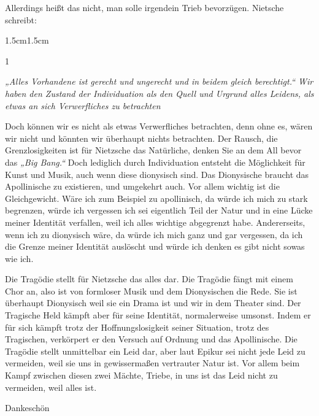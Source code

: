 \documentclass[12pt,a4paper]{article}
\begin{document}
Allerdings heißt das nicht, man solle irgendein Trieb bevorzügen. Nietsche schreibt:
\begin{adjustwidth}{1.5cm}{1.5cm}
    \begin{spacing}{1}
        \begin{center}
            \small
                \textit{„Alles Vorhandene ist gerecht und ungerecht und in beidem gleich berechtigt.“ Wir haben den Zustand der Individuation als den Quell und Urgrund alles Leidens, als etwas an sich Verwerfliches zu betrachten}
        \end{center}
    \end{spacing}
\end{adjustwidth}
Doch können wir es nicht als etwas Verwerfliches betrachten, denn ohne es, wären wir nicht und könnten wir überhaupt nichts betrachten. Der Rausch, die Grenzlosigkeiten ist für Nietzsche das Natürliche, denken Sie an dem All bevor das \textit{„Big Bang.“} Doch lediglich durch Individuation entsteht die Möglichkeit für Kunst und Musik, auch wenn diese dionysisch sind. Das Dionysische braucht das Apollinische zu existieren, und umgekehrt auch. Vor allem wichtig ist die Gleichgewicht. Wäre ich zum Beispiel zu apollinisch, da würde ich mich zu stark begrenzen, würde ich vergessen ich sei eigentlich Teil der Natur und in eine Lücke meiner Identität verfallen, weil ich alles wichtige abgegrenzt habe. Andererseits, wenn ich zu dionysisch wäre, da würde ich mich ganz und gar vergessen, da ich die Grenze meiner Identität auslöscht und würde ich denken es gibt nicht sowas wie ich.\par

Die Tragödie stellt für Nietzsche das alles dar. Die Tragödie fängt mit einem Chor an, also ist von formloser Musik und dem Dionysischen die Rede. Sie ist überhaupt Dionysisch weil sie ein Drama ist und wir in dem Theater sind. Der Tragische Held kämpft aber für seine Identität, normalerweise umsonst. Indem er für sich kämpft trotz der Hoffnungslosigkeit seiner Situation, trotz des Tragischen, verkörpert er den Versuch auf Ordnung und das Apollinische. Die Tragödie stellt unmittelbar ein Leid dar, aber laut Epikur sei nicht jede Leid zu vermeiden, weil sie uns in gewissermaßen vertrauter Natur ist. Vor allem beim Kampf zwischen diesen zwei Mächte, Triebe, in uns ist das Leid nicht zu vermeiden, weil alles ist.

Dankeschön
\end{document}
